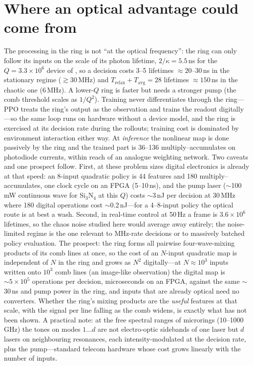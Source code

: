 \documentclass[10pt,a4paper]{article}
\newcommand{\Tavg}{T_{\mathrm{avg}}}
\newcommand{\Trelax}{T_{\mathrm{relax}}}
\begin{document}
\section{Where an optical advantage could come from}
The processing in the ring is not ``at the optical frequency'': the ring can only follow its inputs on the scale of its
photon lifetime, $2/\kappa=5.5$\,ns for the $Q=3.3\times10^6$ device of \cite{ref:prr_2025}, so a decision costs 3--5
lifetimes $\approx20$--30\,ns in the stationary regime ($\gtrsim30$\,MHz) and $\Trelax+\Tavg=28$ lifetimes $\approx150$\,ns in
the chaotic one (6\,MHz).  A lower-$Q$ ring is faster but needs a stronger pump (the comb threshold scales as $1/Q^2$).
Training never differentiates through the ring---PPO treats the ring's output as the observation and trains the readout
digitally---so the same loop runs on hardware without a device model, and the ring is exercised at its decision rate during
the rollouts; training cost is dominated by environment interaction either way.  At \emph{inference} the nonlinear map is
done passively by the ring and the trained part is 36--136 multiply--accumulates on photodiode currents, within reach of an
analogue weighting network.  Two caveats and one prospect follow.  First, at these problem sizes digital electronics is
already at that speed: an 8-input quadratic policy is 44 features and 180 multiply--accumulates, one clock cycle on an
FPGA (5--10\,ns), and the pump laser ($\sim$100\,mW continuous wave for Si$_3$N$_4$ at this $Q$) costs $\sim$3\,nJ per decision
at 30\,MHz where 180 digital operations cost $\sim$0.2\,nJ---for a 4--8-input policy the optical route is at best a wash.
Second, in real-time control at 50\,Hz a frame is $3.6\times10^6$ lifetimes, so the chaos noise studied here would average
away entirely; the noise-limited regime is the one relevant to MHz-rate decisions or to massively batched policy
evaluation.  The prospect: the ring forms all pairwise four-wave-mixing products of its comb lines at once, so the cost of
an $N$-input quadratic map is independent of $N$ in the ring and grows as $N^2$ digitally---at $N\approx10^3$ inputs written
onto $10^3$ comb lines (an image-like observation) the digital map is $\sim5\times10^5$ operations per decision, microseconds
on an FPGA, against the same $\sim$30\,ns and pump power in the ring, and inputs that are already optical need no
converters.  Whether the ring's mixing products are the \emph{useful} features at that scale, with the signal per line
falling as the comb widens, is exactly what has not been shown.  A practical note: at the free spectral ranges of
microrings (10--1000\,GHz) the tones on modes $1\ldots d$ are not electro-optic sidebands of one laser but $d$ lasers on
neighbouring resonances, each intensity-modulated at the decision rate, plus the pump---standard telecom hardware whose
cost grows linearly with the number of inputs.
\end{document}
